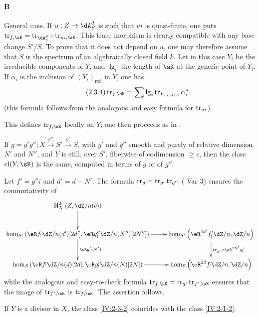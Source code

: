 \paragraph{B}
General case. If $u:Z\to \dA_S^d$ is such that $u i$ is quasi-finite, one puts
$\tr_{f,\sK} = \tr_{\dA_S^d}\circ \tr_{u i,\sK}$. This trace morphism is
clearly compatible with any base change $S'/S$. To prove that it does not
depend on $u$, one may therefore assume that $S$ is the spectrum of an
algebraically closed field $k$. Let in this case $Y_i$ be the irreducible
components of $Y$, and $\operatorname{lg}_i$ the length of $\sK$ at the
generic point of $Y_i$. If $\alpha_i$ is the inclusion of
$(Y_i)_\text{red}$ in $Y$, one has
\begin{equation*}\tag{2.3.4}\label{IV:eq:2-3-4}
  \tr_{f,\sK} = \sum \operatorname{lg}_i \tr_{Y_{i,\text{red}/S}} \alpha_i^\ast
\end{equation*}
(this formula follows from the analogous and easy formula for $\operatorname{tr}_{u i}$).

This defines $\tr_{f,\sK}$ locally on $Y$; one then proceeds as in
\cite[XVIII.2.9]{sga4}.




\begin{lemma}\label{IV:2-3-5}
If $g=g'g'':X\xrightarrow{g''} S'\xrightarrow{g'} S$, with $g'$ and $g''$ smooth
and purely of relative dimension $N'$ and $N''$, and $Y$ is still, over
$S'$, fiberwise of codimension $\geqslant c$, then the class
$\operatorname{cl}(Y,\sK)$ is the same, computed in terms of $g$ or of
$g''$.
\end{lemma}

Let $f'=g'' i$ and $d'=d-N'$. The formula $\operatorname{tr}_g=\operatorname{tr}_{g'}\operatorname{tr}_{g''}$
(\cite[XVIII.2.9]{sga4} Var 3) ensures the commutativity of
\[\xymatrix{
  \h_X^{2 c}\left(Z,\dZ/n(c)\right) \ar[d] \\
  \hom_{S'}\left(\eR f_!\dZ/n(d')[2 d'],\eR g_!''\dZ/n(N'')[2 N'']\right) \ar[r] \ar[d]^-{\eR g_!'(N')}
    & \hom_{S'}\left(\eR^{2 d'} f_!' \dZ/n,\dZ/n\right) \ar[d]^-{\tr_{g'}\circ \eR^{2 N'} g_!'} \\
  \hom_S\left(\eR f_!\dZ/n(d)[2d],\eR g_!'\dZ/n(N)[2 N]\right) \ar[r]
    & \hom_S\left(\eR^{2 d} f_!\dZ/n,\dZ/n\right)
}\]
while the analogous and easy-to-check formula
$\tr_{f,\sK}=\tr_{g'}\tr_{f',\sK}$ ensures that the image of $\tr_{f',\sK}$ is
$\tr_{f,\sK}$. The assertion follows.




\begin{lemma}\label{IV:2-3-6}
If $Y$ is a divisor in $X$, the class \ref{IV:2-3-2} coincides with the
class \ref{IV:2-1-2}.
\end{lemma}

